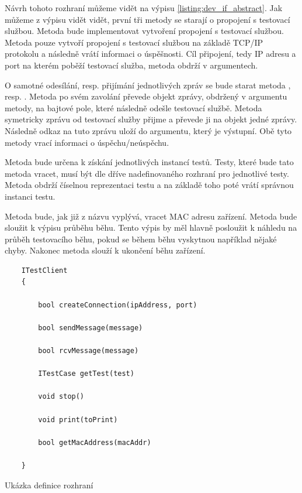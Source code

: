 Návrh tohoto rozhraní můžeme vidět na výpisu \ref{listing:dev_if_abstract}. Jak můžeme z výpisu vidět vidět, první tři metody se starají o propojení s testovací službou. Metoda  bude implementovat vytvoření propojení s testovací službou. Metoda pouze vytvoří propojení s testovací službou na základě TCP/IP protokolu a následně vrátí informaci o úspěšnosti. Cíl připojení, tedy IP adresu a port na kterém poběží testovací služba, metoda obdrží v argumentech.

O samotné odesílání, resp. přijímání jednotlivých zpráv se bude starat metoda , resp. . Metoda  po svém zavolání převede objekt zprávy, obdržený v argumentu metody, na bajtové pole, které následně odešle testovací službě. Metoda  symetricky zprávu od testovací služby přijme a převede ji na objekt jedné zprávy. Následně odkaz na tuto zprávu uloží do argumentu, který je výstupní. Obě tyto metody vrací informaci o úspěchu/neúspěchu.

Metoda  bude určena k získání jednotlivých instancí testů. Testy, které bude tato metoda vracet, musí být dle dříve nadefinovaného rozhraní pro jednotlivé testy. Metoda obdrží číselnou reprezentaci testu a na základě toho poté vrátí správnou instanci testu. 

Metoda  bude, jak již z názvu vyplývá, vracet MAC adresu zařízení. Metoda  bude sloužit k výpisu průběhu běhu. Tento výpis by měl hlavně posloužit k náhledu na průběh testovacího běhu, pokud se během běhu vyskytnou například nějaké chyby. Nakonec metoda  slouží k ukončení běhu zařízení.

\begin{listing}[htbp]
    \begin{verbatim}
    ITestClient 
    {

        bool createConnection(ipAddress, port)

        bool sendMessage(message)

        bool rcvMessage(message)

        ITestCase getTest(test)

        void stop()

        void print(toPrint)

        bool getMacAddress(macAddr)
    
    }
    \end{verbatim}
\caption{Ukázka definice rozhraní}
\label{listing:dev_if_abstract}
\end{listing}

